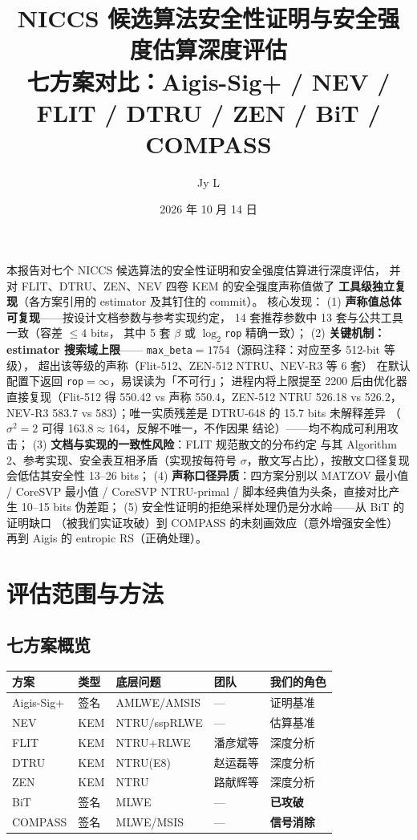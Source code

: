\documentclass[11pt,a4paper]{ctexart}
\title{\bfseries NICCS 候选算法安全性证明与安全强度估算深度评估\\[0.3em]
\large 七方案对比：Aigis-Sig+ / NEV / FLIT / DTRU / ZEN / BiT / COMPASS}
\author{Jy L}
\date{2026 年 10 月 14 日}
\begin{document}
\maketitle
\tableofcontents

\begin{keybox}[摘要]
本报告对七个 NICCS 候选算法的安全性证明和安全强度估算进行深度评估，
并对 FLIT、DTRU、ZEN、NEV 四卷 KEM 的安全强度声称值做了
\textbf{工具级独立复现}（各方案引用的 estimator 及其钉住的 commit）。
核心发现：
(1) \textbf{声称值总体可复现}——按设计文档参数与参考实现约定，
14 套推荐参数中 13 套与公共工具一致（容差 $\le 4$ bits，
其中 5 套 $\beta$ 或 $\log_2$\texttt{rop} 精确一致）；
(2) \textbf{关键机制：estimator 搜索域上限}——
\texttt{max\_beta}$=1754$（源码注释：对应至多 512-bit 等级），
超出该等级的声称（Flit-512、ZEN-512 NTRU、NEV-R3 等 6 套）
在默认配置下返回 \texttt{rop}$=\infty$，易误读为「不可行」；
进程内将上限提至 2200 后由优化器直接复现（Flit-512 得 550.42
vs 声称 550.4，ZEN-512 NTRU 526.18 vs 526.2，NEV-R3 583.7 vs
583）；唯一实质残差是 DTRU-648 的 15.7 bits 未解释差异
（$\sigma^2{=}2$ 可得 163.8$\approx$164，反解不唯一，不作因果
结论）——均不构成可利用攻击；
(3) \textbf{文档与实现的一致性风险}：FLIT 规范散文的分布约定
与其 Algorithm 2、参考实现、安全表互相矛盾（实现按每符号
$\sigma$，散文写占比），按散文口径复现会低估其安全性
13--26 bits；
(4) \textbf{声称口径异质}：四方案分别以 MATZOV 最小值 / CoreSVP
最小值 / CoreSVP NTRU-primal / 脚本经典值为头条，直接对比产生
10--15 bits 伪差距；
(5) 安全性证明的拒绝采样处理仍是分水岭——从 BiT 的证明缺口
（被我们实证攻破）到 COMPASS 的未刻画效应（意外增强安全性）
再到 Aigis 的 entropic RS（正确处理）。
\end{keybox}

\section{评估范围与方法}

\subsection{七方案概览}

\begin{table}[htbp]\centering\small
\begin{tabular}{@{}lllll@{}}
\toprule
方案 & 类型 & 底层问题 & 团队 & 我们的角色 \\
\midrule
Aigis-Sig+ & 签名 & AMLWE/AMSIS & — & 证明基准 \\
NEV & KEM & NTRU/sspRLWE & — & 估算基准 \\
FLIT & KEM & NTRU+RLWE & 潘彦斌等 & 深度分析 \\
DTRU & KEM & NTRU(E8) & 赵运磊等 & 深度分析 \\
ZEN & KEM & NTRU & 路献辉等 & 深度分析 \\
BiT & 签名 & MLWE & — & \textbf{已攻破} \\
COMPASS & 签名 & MLWE/MSIS & — & \textbf{信号消除} \\
\bottomrule
\end{tabular}
\end{table}
\end{document}

